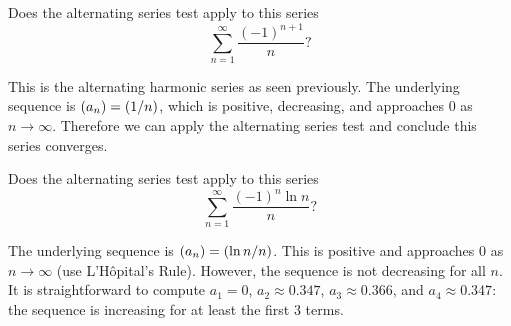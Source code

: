 \documentclass{ximera}
\begin{document}

\begin{question}
  Does the alternating series test apply to this series
  \[
  \sum_{n=1}^\infty \frac{(-1)^{n+1}}{n} ?
  \]
  \begin{prompt}
    \begin{multipleChoice}
    \end{multipleChoice}
    \begin{feedback}
      This is the alternating harmonic series as seen previously. The
      underlying sequence is $\left( a_n \right) = \left( 1/n \right)$, which is
      positive, decreasing, and approaches 0 as
      $n\to\infty$. Therefore we can apply the alternating series test
      and conclude this series converges.
      
    \end{feedback}
  \end{prompt}
  \begin{question}
    Does the alternating series test apply to this series
    \[
    \sum_{n=1}^\infty \frac{(-1)^n\ln n}{n}?
    \]
    \begin{prompt}
      \begin{multipleChoice}
      \end{multipleChoice}
      \begin{feedback}
        The underlying sequence is $\left( a_n \right) = \left( \ln n/n \right)$. This
        is positive and approaches $0$ as $n\to\infty$ (use
        L'H\^opital's Rule). However, the sequence is not decreasing
        for all $n$. It is straightforward to compute $a_1=0$,
        $a_2\approx0.347$, $a_3\approx 0.366$, and $a_4\approx 0.347$:
        the sequence is increasing for at least the first $3$ terms.
      

\end{feedback}
\end{prompt}
\end{question}
\end{question}
\end{document}

